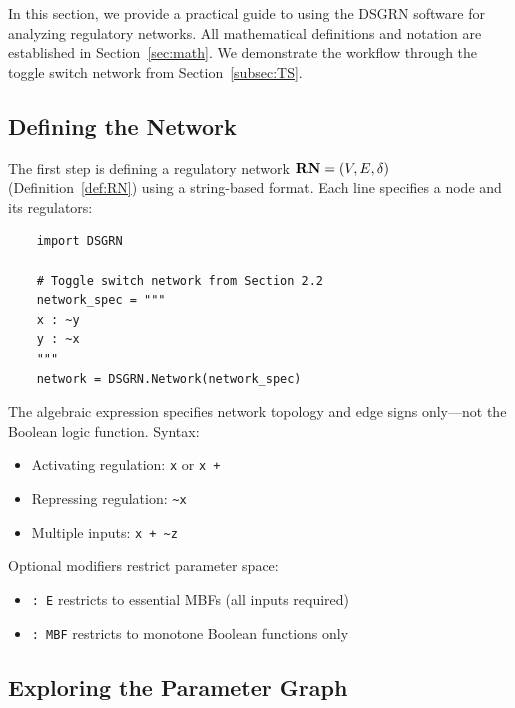 \documentclass[12pt, notitlepage]{amsart}
\newcommand{\bRN}{{\bf RN}}
\theoremstyle{definition}
\begin{document}
    In this section, we provide a practical guide to using the DSGRN software for analyzing regulatory networks. All mathematical definitions and notation are established in Section~\ref{sec:math}. We demonstrate the workflow through the toggle switch network from Section~\ref{subsec:TS}.


    \subsection{Defining the Network}

    The first step is defining a regulatory network $\bRN = (V, E, \delta)$ (Definition~\ref{def:RN}) using a string-based format. Each line specifies a node and its regulators:

    \begin{lstlisting}
    import DSGRN

    # Toggle switch network from Section 2.2
    network_spec = """
    x : ~y
    y : ~x
    """
    network = DSGRN.Network(network_spec)
    \end{lstlisting}

    The algebraic expression specifies network topology and edge signs only---not the Boolean logic function. Syntax:
    \begin{itemize}
    \item Activating regulation: \texttt{x} or \texttt{x +}
    \item Repressing regulation: \texttt{\textasciitilde x}
    \item Multiple inputs: \texttt{x + \textasciitilde z}
    \end{itemize}

    Optional modifiers restrict parameter space:
    \begin{itemize}
    \item \texttt{: E} restricts to essential MBFs (all inputs required)
    \item \texttt{: MBF} restricts to monotone Boolean functions only
    \end{itemize}


    \subsection{Exploring the Parameter Graph}
\end{document}
